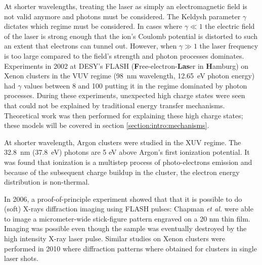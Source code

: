 At shorter wavelengths, treating the laser as simply an electromagnetic field
is not valid anymore and photons must be considered.
The Keldysh parameter $\gamma$ dictates which regime must be considered. In
cases where $\gamma \ll 1$ the electric field of the laser is strong enough that
the ion's Coulomb potential is
distorted to such an extent
%
that electrons can tunnel out.
However, when $\gamma \gg 1$ the laser frequency is too large compared to the
field's strength and photon processes dominates.
%
%
Experiments in
2002\cite{Wabnitz2002,Bostedt2009} at
DESY's FLASH (\textbf{F}ree-electron-\textbf{Las}er in \textbf{H}amburg)
on Xenon clusters in the VUV regime (98~nm wavelength, 12.65~eV photon energy)
had $\gamma$ values between 8 and
100 putting it in the regime dominated by photon processes.
During these experiments, unexpected high charge states were seen that could not
be explained by traditional energy transfer mechanisms. Theoretical work was
then performed for explaining these high charge states; these models will be
covered in section \ref{section:intro:mechanisms}.



At shorter wavelength,
Argon clusters were studied in the XUV regime\cite{Bostedt2008}. The 32.8~nm
(37.8~eV) photons are 5 eV above Argon's first ionization
potential. It was found that ionization is a multistep process of
photo-electrons emission and because of the subsequent charge buildup in the
cluster, the electron energy distribution is non-thermal.

In 2006, a proof-of-principle experiment showed that that it is possible to
do (soft) X-rays diffraction imaging using FLASH pulses\cite{Chapman2006}:
Chapman \textit{et al.} were able to image a micrometer-wide stick-figure pattern
engraved on a 20 nm thin film. Imaging was possible even though the sample was
eventually destroyed by the high intensity X-ray laser pulse.
Similar studies on Xenon clusters were performed in 2010\cite{Bostedt2010} where
diffraction patterns where obtained for clusters in single laser shots.%

